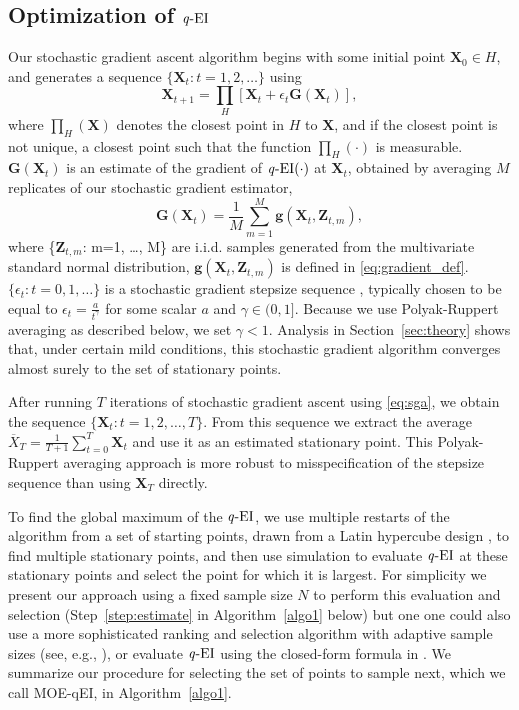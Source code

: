 \documentclass[paper=letter]{scrartcl}
\newcommand{\qEI}{\text{\textit q-EI}}
\begin{document}
\subsection{Optimization of $\qEI$} \label{sec:optimization_qEI}
Our stochastic gradient ascent algorithm begins with some
initial point $\bm{X}_0 \in H$,
and generates a sequence 
$\{\bm{X}_t: t=1, 2, \ldots\}$ using
\begin{equation}
  \bm{X}_{t+1} = \prod_{H} \left[ \bm{X}_{t} + \epsilon_t \bm{G}(\bm{X}_t) \right],
  \label{eq:sga}
\end{equation}
where $\prod_{H}(\bm{X})$ denotes the closest point in $H$ to $\bm{X}$,
and if the closest point is not unique, a closest point such that the function $\prod_{H}(\cdot)$ is measurable. 
$\bm{G}(\bm{X}_t)$ is an estimate of the gradient of $\qEI(\cdot)$ at $\bm{X}_t$, 
obtained by averaging 
$M$ replicates of our stochastic gradient estimator,
\begin{equation}
  \bm{G}(\bm{X}_t) = \frac{1}{M} \sum_{m=1}^M \bm{g}(\bm{X}_t, \bm{Z}_{t,m}),
  \label{eq:G_eval}
\end{equation}
where \{$\bm{Z}_{t,m}$: m=1, \dots, M\} are i.i.d. samples generated from the multivariate standard normal distribution,
$\bm{g}(\bm{X}_t, \bm{Z}_{t,m})$ is defined in \eqref{eq:gradient_def}.
$\{\epsilon_t: t=0, 1, \ldots\}$ is a stochastic gradient stepsize sequence 
\citep{kushner2003stochastic}, typically chosen to be equal to $\epsilon_t = \frac{a}{t^{\gamma}}$
for some scalar $a$ and $\gamma\in(0,1]$.  Because we use Polyak-Ruppert averaging as described below, we set $\gamma<1$.
Analysis in Section~\ref{sec:theory} shows that, under certain mild conditions, 
this stochastic gradient algorithm 
converges almost surely to the set of stationary points. 

After running $T$ iterations of stochastic gradient ascent using \eqref{eq:sga}, we obtain the sequence $\{\bm{X}_t : t=1,2,\ldots,T\}$.
From this sequence we extract the average $\overline{X}_T = \frac1{T+1} \sum_{t=0}^T \bm{X}_t$ and use it as an estimated stationary point.   This Polyak-Ruppert averaging approach \citep{polyak1990new,ruppert1988efficient} is more robust to misspecification of the stepsize sequence than using $\bm{X}_T$ directly.

To find the global maximum of the $\qEI$, we use multiple restarts of the 
algorithm from a set of starting points, drawn from a Latin
hypercube design \citep{mckay2000comparison}, to find multiple stationary points,
and then use simulation
to evaluate $\qEI$ at these stationary points and select the point for which it is largest.
For simplicity we present our approach using a fixed sample size $N$ to perform this evaluation and selection (Step~\ref{step:estimate} in Algorithm~\ref{algo1} below) 
but one one could also use a more sophisticated ranking and selection algorithm with adaptive sample sizes (see, e.g., \citealt{kim2007recent}), or evaluate $\qEI$ using the closed-form formula in \cite{chevalier2013fast}.
We summarize our procedure for selecting the set of points to sample next, which we call MOE-qEI, in Algorithm~\ref{algo1}.
\end{document}
